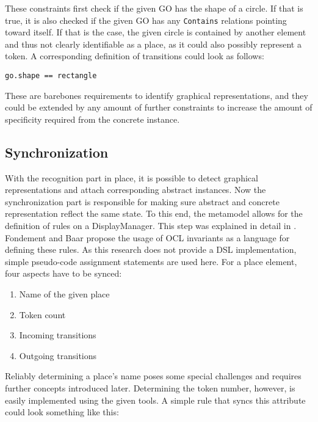 These constraints first check if the given GO has the shape of a circle. If that is true, it is also checked if the given GO has any \texttt{Contains} relations pointing toward itself. If that is the case, the given circle is contained by another element and thus not clearly identifiable as a place, as it could also possibly represent a token. A corresponding definition of transitions could look as follows:

\begin{lstlisting}[captionpos=b,caption={Simple constraint to check for transition representations},label={lst:transition-constraints}]
go.shape == rectangle
\end{lstlisting}

These are barebones requirements to identify graphical representations, and they could be extended by any amount of further constraints to increase the amount of specificity required from the concrete instance.

\subsection{Synchronization}
With the recognition part in place, it is possible to detect graphical representations and attach corresponding abstract instances. Now the synchronization part is responsible for making sure abstract and concrete representation reflect the same state. To this end, the metamodel allows for the definition of rules on a DisplayManager. This step was explained in detail in \cite{fondement_making_2005}. Fondement and Baar propose the usage of OCL invariants as a language for defining these rules. As this research does not provide a DSL implementation, simple pseudo-code assignment statements are used here. For a place element, four aspects have to be synced:

\begin{enumerate}
  \item Name of the given place
  \item Token count
  \item Incoming transitions
  \item Outgoing transitions
\end{enumerate}

Reliably determining a place's name poses some special challenges and requires further concepts introduced later. Determining the token number, however, is easily implemented using the given tools. A simple rule that syncs this attribute could look something like this:

